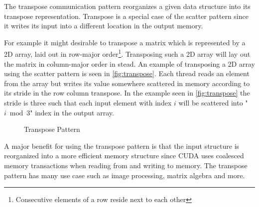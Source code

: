 The transpose communication pattern reorganizes a given data structure into its transpose representation.
Transpose is a special case of the scatter pattern since it writes its input into a different location in the output memory.

For example it might desirable to transpose a matrix which is represented by a 2D array, laid out in row-major order\footnote{Consecutive elements of a row reside next to each other}.
Transposing such a 2D array will lay out the matrix in column-major order in stead.
An example of transposing a 2D array using the scatter pattern is seen in \autoref{fig:transpose}.
Each thread reads an element from the array but writes its value somewhere scattered in memory according to its stride in the row column transpose.
In the example seen in \autoref{fig:transpose} the stride is three such that each input element with index $i$ will be scattered into "$i\bmod 3$" index in the output array.
\begin{figure}[ht]
	\centering
	\caption{Transpose Pattern}
	\label{fig:transpose}
\end{figure}
A major benefit for using the transpose pattern is that the input structure is reorganized into a more efficient memory structure since CUDA uses coalesced memory transactions when reading from and writing to memory.
The transpose pattern has many use case such as image processing, matrix algebra and more.